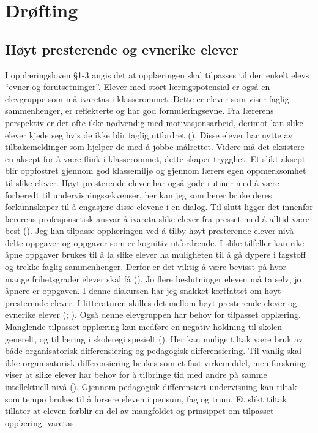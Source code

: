 \documentclass[main.tex]{subfiles}
\begin{document}
\section*{Drøfting}

\subsection*{Høyt presterende og evnerike elever}

I opplæringsloven \S 1-3 angis det at opplæringen skal tilpasses til den enkelt elevs ``evner og forutsetninger''.  Elever med stort læringspotensial er også en elevgruppe som må ivaretas i klasserommet. Dette er elever som viser faglig sammenhenger, er reflekterte og har god formuleringsevne. Fra lærerens perspektiv er det ofte ikke nødvendig med motivasjonsarbeid, derimot kan slike elever kjede seg hvis de ikke blir faglig utfordret (). Disse elever har nytte av tilbakemeldinger som hjelper de med å jobbe målrettet. Videre må det eksistere en aksept for å være flink i klasserommet, dette skaper trygghet. Et slikt aksept blir oppfostret gjennom god klassemiljø og gjennom lærers egen oppmerksomhet til slike elever. Høyt presterende elever har også gode rutiner med å være forberedt til undervisningssekvenser, her kan jeg som lærer bruke deres forkunnskaper til å engasjere disse elevene i en dialog. Til slutt ligger det innenfor lærerens profesjonsetisk ansvar å ivareta slike elever fra presset med å alltid være best (). 
\newline\newline
Jeg kan tilpasse opplæringen ved å tilby høyt presterende elever nivå-delte oppgaver og oppgaver som er kognitiv utfordrende. I slike tilfeller kan rike åpne oppgaver brukes til å la slike elever ha muligheten til å gå dypere i fagstoff og trekke faglig sammenhenger.  Derfor er det viktig å være bevisst på hvor mange frihetsgrader elever skal få (). Jo flere beslutninger eleven må ta selv, jo åpnere er oppgaven.
\newline\newline 
I denne diskursen har jeg snakket kortfattet om høyt presterende elever. I litteraturen skilles det mellom høyt presterende elever og evnerike elever (; ). Også denne elevgruppen har behov for tilpasset opplæring. Manglende tilpasset opplæring kan medføre en negativ holdning til skolen generelt, og til læring i skoleregi spesielt (). Her kan mulige tiltak være bruk av både organisatorisk differensiering og pedagogisk differensiering. Til vanlig skal ikke organisatorisk differensiering brukes som et fast virkemiddel, men forskning viser at slike elever har behov for å tilbringe tid med andre på samme intellektuell nivå (). Gjennom pedagogisk differensiert undervisning kan tiltak som tempo brukes til å forsere eleven i pensum, fag og trinn. Et slikt tiltak tillater at eleven forblir en del av mangfoldet og prinsippet om tilpasset opplæring ivaretas.
\end{document}
